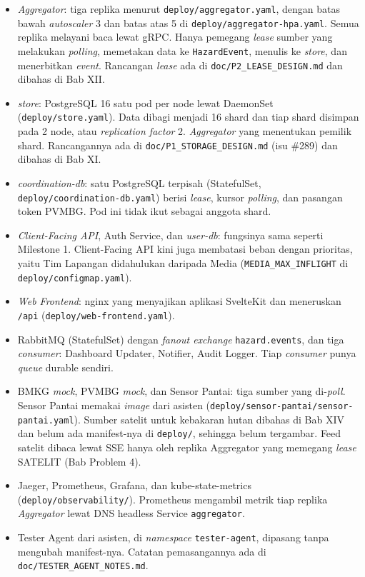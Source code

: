 \begin{itemize}
\item \textit{Aggregator}: tiga replika menurut \texttt{deploy/aggregator.yaml}, dengan batas bawah \textit{autoscaler} 3 dan batas atas 5 di \texttt{deploy/aggregator-hpa.yaml}. Semua replika melayani baca lewat gRPC. Hanya pemegang \textit{lease} sumber yang melakukan \textit{polling}, memetakan data ke \texttt{HazardEvent}, menulis ke \textit{store}, dan menerbitkan \textit{event}. Rancangan \textit{lease} ada di \texttt{doc/P2\_LEASE\_DESIGN.md} dan dibahas di Bab XII.
\item \textit{store}: PostgreSQL 16 satu pod per node lewat DaemonSet (\texttt{deploy/store.yaml}). Data dibagi menjadi 16 shard dan tiap shard disimpan pada 2 node, atau \textit{replication factor} 2. \textit{Aggregator} yang menentukan pemilik shard. Rancangannya ada di \texttt{doc/P1\_STORAGE\_DESIGN.md} (isu \#289) dan dibahas di Bab XI.
\item \textit{coordination-db}: satu PostgreSQL terpisah (StatefulSet, \texttt{deploy/coordination-db.yaml}) berisi \textit{lease}, kursor \textit{polling}, dan pasangan token PVMBG. Pod ini tidak ikut sebagai anggota shard.
\item \textit{Client-Facing API}, Auth Service, dan \textit{user-db}: fungsinya sama seperti Milestone 1. Client-Facing API kini juga membatasi beban dengan prioritas, yaitu Tim Lapangan didahulukan daripada Media (\texttt{MEDIA\_MAX\_INFLIGHT} di \texttt{deploy/configmap.yaml}).
\item \textit{Web Frontend}: nginx yang menyajikan aplikasi SvelteKit dan meneruskan \texttt{/api} (\texttt{deploy/web-frontend.yaml}).
\item RabbitMQ (StatefulSet) dengan \textit{fanout exchange} \texttt{hazard.events}, dan tiga \textit{consumer}: Dashboard Updater, Notifier, Audit Logger. Tiap \textit{consumer} punya \textit{queue} durable sendiri.
\item BMKG \textit{mock}, PVMBG \textit{mock}, dan Sensor Pantai: tiga sumber yang di-\textit{poll}. Sensor Pantai memakai \textit{image} dari asisten (\texttt{deploy/sensor-pantai/sensor-pantai.yaml}). Sumber satelit untuk kebakaran hutan dibahas di Bab XIV dan belum ada manifest-nya di \texttt{deploy/}, sehingga belum tergambar. Feed satelit dibaca lewat SSE hanya oleh replika Aggregator yang memegang \textit{lease} SATELIT (Bab Problem 4).
\item Jaeger, Prometheus, Grafana, dan kube-state-metrics (\texttt{deploy/observability/}). Prometheus mengambil metrik tiap replika \textit{Aggregator} lewat DNS headless Service \texttt{aggregator}.
\item Tester Agent dari asisten, di \textit{namespace} \texttt{tester-agent}, dipasang tanpa mengubah manifest-nya. Catatan pemasangannya ada di \texttt{doc/TESTER\_AGENT\_NOTES.md}.
\end{itemize}

